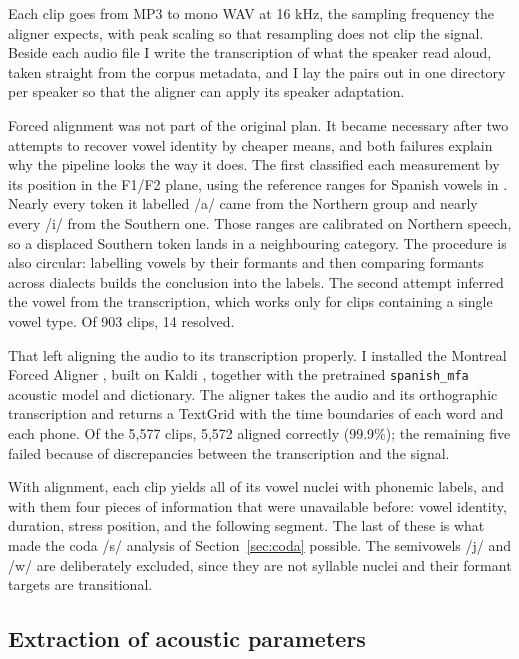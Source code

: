 \documentclass[11pt]{article}
\begin{document}
Each clip goes from MP3 to mono WAV at 16 kHz, the sampling frequency the aligner
expects, with peak scaling so that resampling does not clip the signal. Beside
each audio file I write the transcription of what the speaker read aloud, taken
straight from the corpus metadata, and I lay the pairs out in one directory per
speaker so that the aligner can apply its speaker adaptation.

Forced alignment was not part of the original plan. It became necessary after two
attempts to recover vowel identity by cheaper means, and both failures explain
why the pipeline looks the way it does. The first classified each measurement by
its position in the F1/F2 plane, using the reference ranges for Spanish vowels in
\citet{quilis1981}. Nearly every token it labelled /a/ came from the Northern
group and nearly every /i/ from the Southern one. Those ranges are calibrated on
Northern speech, so a displaced Southern token lands in a neighbouring category.
The procedure is also circular: labelling vowels by their formants and
then comparing formants across dialects builds the conclusion into the labels.
The second attempt inferred the vowel from the transcription, which works only
for clips containing a single vowel type. Of 903 clips, 14 resolved.

That left aligning the audio to its transcription properly. I installed the
Montreal Forced Aligner \citep{mcauliffe2017}, built on Kaldi \citep{povey2011},
together with the pretrained \texttt{spanish\_mfa} acoustic model and dictionary.
The aligner takes the audio and its orthographic transcription and returns a
TextGrid with the time boundaries of each word and each phone. Of the 5,577
clips, 5,572 aligned correctly (99.9\%); the remaining five failed because of
discrepancies between the transcription and the signal.

With alignment, each clip yields all of its vowel nuclei with phonemic labels,
and with them four pieces of information that were unavailable before: vowel
identity, duration, stress position, and the following segment. The last of these
is what made the coda /s/ analysis of Section~\ref{sec:coda} possible. The
semivowels /j/ and /w/ are deliberately excluded, since they are not syllable
nuclei and their formant targets are transitional.

\subsection{Extraction of acoustic parameters}
\end{document}
